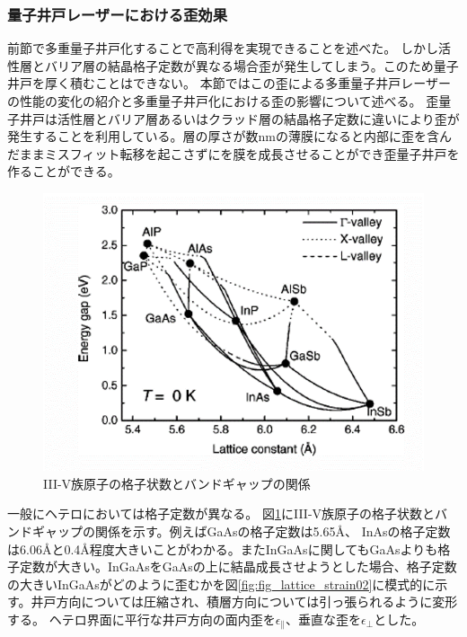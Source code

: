\subsubsection{量子井戸レーザーにおける歪効果}
前節で多重量子井戸化することで高利得を実現できることを述べた。
しかし活性層とバリア層の結晶格子定数が異なる場合歪が発生してしまう。このため量子井戸を厚く積むことはできない。
本節ではこの歪による多重量子井戸レーザーの性能の変化の紹介と多重量子井戸化における歪の影響について述べる。
歪量子井戸は活性層とバリア層あるいはクラッド層の結晶格子定数に違いにより歪が発生することを利用している。層の厚さが数nmの薄膜になると内部に歪を含んだままミスフィット転移を起こさずにを膜を成長させることができ歪量子井戸を作ることができる。
\begin{figure}[h]
	\centering
	\includegraphics[width=14cm]{figure/fig_1_1_lattice_constance.png}
	\caption{III-V族原子の格子状数とバンドギャップの関係\cite{ref_band_para}}
	\label{fig:fig_1_1_lattice_constance}
\end{figure}

一般にヘテロにおいては格子定数が異なる。
図\ref{fig:fig_1_1_lattice_constance}にIII-V族原子の格子状数とバンドギャップの関係を示す\cite{ref_band_para}。例えばGaAsの格子定数は5.65\AA 、 InAsの格子定数は6.06\AA と0.4\AA 程度大きいことがわかる。またInGaAsに関してもGaAsよりも格子定数が大きい。InGaAsをGaAsの上に結晶成長させようとした場合、格子定数の大きいInGaAsがどのように歪むかを図\ref{fig:fig_lattice_strain02}に模式的に示す。井戸方向については圧縮され、積層方向については引っ張られるように変形する。
ヘテロ界面に平行な井戸方向の面内歪を$\epsilon_{\|}$、垂直な歪を$\epsilon_{\bot}$とした。


